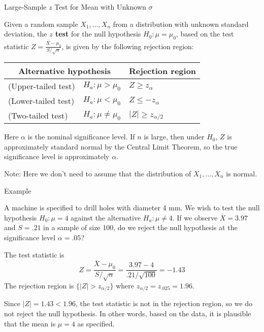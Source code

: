 \documentclass{beamer}
\renewcommand{\emph}{\textbf}
\begin{document}
\begin{frame}{Large-Sample $z$ Test for Mean with Unknown $\sigma$}
\begin{block}{}
Given a random sample $X_1,\dots,X_n$ from a distribution with unknown standard deviation, the \emph{$z$ test} for the null hypothesis $H_0: \mu=\mu_0$, based on the test statistic $Z=\frac{\overline X-\mu_0}{S/\sqrt{n}}$, is given by the following rejection region:
\begin{center}
\begin{tabular}{ll|l}
\multicolumn{2}{c}{Alternative hypothesis} & Rejection region \\ \hline
(Upper-tailed test) & $H_a: \mu>\mu_0$ & $Z\geq z_{\alpha}$ \\
(Lower-tailed test) & $H_a: \mu<\mu_0$ & $Z\leq -z_{\alpha}$ \\
(Two-tailed test) & $H_a: \mu\neq\mu_0$ & $|Z|\geq z_{\alpha/2}$\\
\end{tabular}
\end{center}
Here $\alpha$ is the nominal significance level. If $n$ is large, then under $H_0$, $Z$ is approximately standard normal by the Central Limit Theorem, so the true significance level is approximately $\alpha$.
\end{block}
Note: Here we don't need to assume that the distribution of $X_1,\dots,X_n$ is normal.
\end{frame}


\begin{frame}{Example}
\begin{block}{}
A machine is specified to drill holes with diameter 4 mm. We wish to test the null hypothesis $H_0: \mu=4$ against the alternative $H_a: \mu\neq 4$. If we observe $\overline X=3.97$ and $S=.21$ in a sample of size 100, do we reject the null hypothesis at the significance level $\alpha=.05$?
\end{block}

\pause
The test statistic is 
$$Z=\frac{\overline X-\mu_0}{S/\sqrt{n}}=\frac{3.97-4}{.21/\sqrt{100}}=-1.43$$
\pause The rejection region is $\{|Z|>z_{\alpha/2}\}$ where $z_{\alpha/2}=z_{.025}=1.96$.

\vspace{.2cm}
\pause Since $|Z|=1.43<1.96$, the test statistic is not in the rejection region, so we do not reject the null hypothesis. In other words, based on the data, it is plausible that the mean is $\mu=4$ as specified.
\end{frame}
\end{document}
